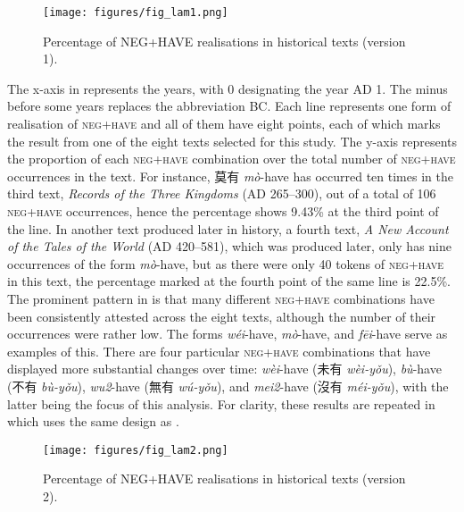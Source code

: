 \documentclass[output=paper]{langscibook}
\begin{document}
\begin{figure}
  \texttt{[image: figures/fig\_lam1.png]}
  \caption{Percentage of NEG+HAVE realisations in historical texts (version 1).}
  \label{fig:lam1}
\end{figure}

The x-axis in  represents the years, with 0 designating the year AD 1. The minus before some years replaces the abbreviation BC. Each line represents one form of realisation of \textsc{neg}+\textsc{have} and all of them have eight points, each of which marks the result from one of the eight texts selected for this study. The y-axis represents the proportion of each \textsc{neg}+\textsc{have} combination over the total number of \textsc{neg}+\textsc{have} occurrences in the text. For instance, 莫有 \textit{mò}-have has occurred ten times in the third text, \emph{Records of the Three Kingdoms} (AD 265–300), out of a total of 106 \textsc{neg}+\textsc{have} occurrences, hence the percentage shows 9.43\% at the third point of the line. In another text produced later in history, a fourth text, \emph{A New Account of the Tales of the World} (AD 420–581), which was produced later, only has nine occurrences of the form \textit{mò}-have, but as there were only 40 tokens of \textsc{neg}+\textsc{have} in this text, the percentage marked at the fourth point of the same line is 22.5\%. The prominent pattern in  is that many different \textsc{neg}+\textsc{have} combinations have been consistently attested across the eight texts, although the number of their occurrences were rather low. The forms \textit{wéi}-have, \textit{mò}-have, and \textit{fēi}-have serve as examples of this. There are four particular \textsc{neg}+\textsc{have} combinations that have displayed more substantial changes over time: \textit{wèi}-have (未有 \textit{wèi-yǒu}), \textit{bù}-have (不有 \textit{bù-yǒu}), \textit{wu2}-have (無有 \textit{wú-yǒu}), and \textit{mei2}-have (沒有 \textit{méi-yǒu}), with the latter being the focus of this analysis. For clarity, these results are repeated in  which uses the same design as .

\begin{figure}
  \texttt{[image: figures/fig\_lam2.png]}
  \caption{Percentage of NEG+HAVE realisations in historical texts (version 2).}
  \label{fig:lam2}
\end{figure}
\end{document}
